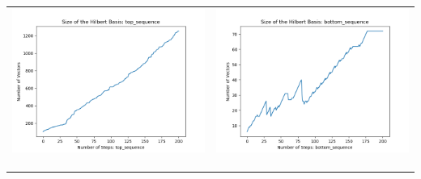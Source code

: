 \documentclass[10pt]{article}
\begin{document}
\begin{tabular}{c|c}
\begin{minipage}{.4\textwidth}
\includegraphics[width=\textwidth]{"DATA/5d/6 generators 2 bound A/top_sequence SIZE"}
\end{minipage} &
\begin{minipage}{.4\textwidth}
\includegraphics[width=\textwidth]{"DATA/5d/6 generators 2 bound A bottomup/bottom_sequence SIZE"}
\end{minipage} \\ \\
\hline \\\begin{minipage}{.4\textwidth}

\end{minipage}
\end{tabular}
\end{document}
